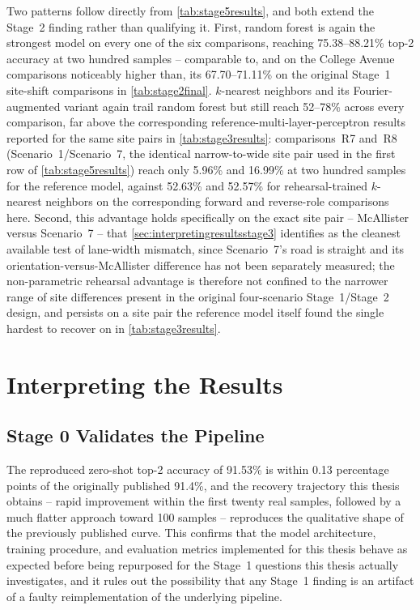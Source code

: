 \documentclass{iutbscthesis}
\begin{document}
Two patterns follow directly from \autoref{tab:stage5results}, and both extend the Stage~2 finding rather than qualifying it. First, random forest is again the strongest model on every one of the six comparisons, reaching 75.38--88.21\% top-2 accuracy at two hundred samples -- comparable to, and on the College Avenue comparisons noticeably higher than, its 67.70--71.11\% on the original Stage~1 site-shift comparisons in \autoref{tab:stage2final}. $k$-nearest neighbors and its Fourier-augmented variant again trail random forest but still reach 52--78\% across every comparison, far above the corresponding reference-multi-layer-perceptron results reported for the same site pairs in \autoref{tab:stage3results}: comparisons~R7 and~R8 (Scenario~1/Scenario~7, the identical narrow-to-wide site pair used in the first row of \autoref{tab:stage5results}) reach only 5.96\% and 16.99\% at two hundred samples for the reference model, against 52.63\% and 52.57\% for rehearsal-trained $k$-nearest neighbors on the corresponding forward and reverse-role comparisons here. Second, this advantage holds specifically on the exact site pair -- McAllister versus Scenario~7 -- that \autoref{sec:interpretingresultsstage3} identifies as the cleanest available test of lane-width mismatch, since Scenario~7's road is straight and its orientation-versus-McAllister difference has not been separately measured; the non-parametric rehearsal advantage is therefore not confined to the narrower range of site differences present in the original four-scenario Stage~1/Stage~2 design, and persists on a site pair the reference model itself found the single hardest to recover on in \autoref{tab:stage3results}.

\section{Interpreting the Results}
\label{sec:interpretingresults}

\subsection{Stage 0 Validates the Pipeline}

The reproduced zero-shot top-2 accuracy of 91.53\% is within 0.13 percentage points of the originally published 91.4\%, and the recovery trajectory this thesis obtains -- rapid improvement within the first twenty real samples, followed by a much flatter approach toward 100 samples -- reproduces the qualitative shape of the previously published curve. This confirms that the model architecture, training procedure, and evaluation metrics implemented for this thesis behave as expected before being repurposed for the Stage~1 questions this thesis actually investigates, and it rules out the possibility that any Stage~1 finding is an artifact of a faulty reimplementation of the underlying pipeline.
\end{document}
